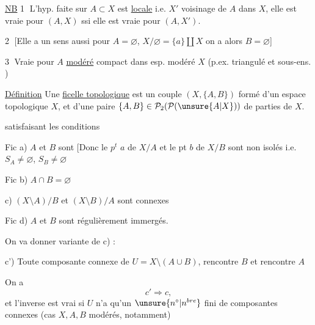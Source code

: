 \uline{NB} \textcircled{1} L'hyp. faite sur $A\subset X$ est \uline{locale}
i.e.  $X'$ voisinage de $A$ dans $X$,
elle est vraie pour $(A,X)$ ssi elle est vraie pour $(A,X')$.

\textcircled{2} [Elle a un sens aussi pour $A=\varnothing$,
$X/\varnothing=\{a\}\amalg X$ on a alors $B=\varnothing$]

\textcircled{3} Vraie pour $A$  \uline{modéré} compact dans esp. modéré $X$
(p.ex.  triangulé et sous-ens. )


\uline{Définition} Une \uline{ficelle topologique}
est un couple $(X,\{A,B\})$ formé d'un espace topologique $X$, et d'une paire
$\{A,B\}\in\mathcal P_2(\mathcal P(\unsure{A|X}))$ de parties de $X$.


satisfaisant les conditions

Fic a) $A$ et $B$ sont 
[Donc le $p^t$ $a$ de $X/A$ et le pt $b$ de $X/B$ sont non isolés
i.e. $S_A\ne\varnothing$, $S_B\ne\varnothing$

Fic b)  $A\cap B=\varnothing$

c) $(X\setminus A)/B$ et $(X\setminus B)/A$ sont connexes

Fic d) $A$ et $B$ sont régulièrement immergés.



On va donner   variante de c) :

c')  Toute composante connexe  de $U=X\setminus(A\cup B)$,
 rencontre $B$ et rencontre $A$

On a
\[
c'\Longrightarrow c,
\]
et l'inverse est vrai si $U$ n'a qu'un $\unsure{n^\circ|n^{bre}}$ fini de composantes connexes
(cas $X,A,B$ modérés, notamment)


